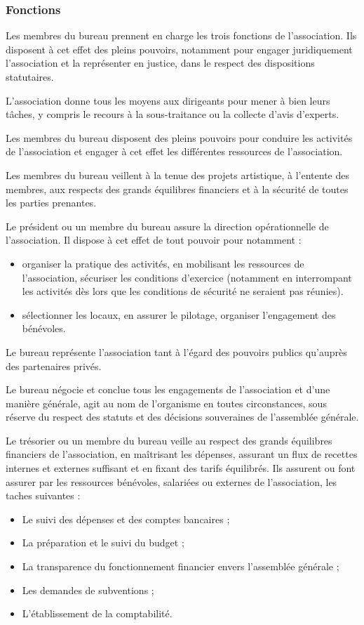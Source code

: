 \documentclass[a4paper,french,10pt]{article}
\begin{document}
\subsubsection{Fonctions}
\label{sec:fonctions}

Les membres du bureau prennent en charge les trois fonctions de
l’association.  Ils disposent à cet effet des pleins pouvoirs,
notamment pour engager juridiquement l’association et la représenter
en justice, dans le respect des dispositions statutaires.

L’association donne tous les moyens aux dirigeants pour mener à bien
leurs tâches, y compris le recours à la sous-traitance ou la collecte
d’avis d’experts.

Les membres du bureau disposent des pleins pouvoirs pour conduire les
activités de l’association et engager à cet effet les différentes
ressources de l’association.

Les membres du bureau veillent à la tenue des projets artistique, à
l'entente des membres, aux respects des grands équilibres financiers
et à la sécurité de toutes les parties prenantes.  


Le président ou un membre du bureau assure la direction opérationnelle de
l’association. Il dispose à cet effet de tout pouvoir pour notamment :
\begin{itemize}
\item organiser la pratique des activités, en mobilisant les
  ressources de l’association, sécuriser les conditions d’exercice
  (notamment en interrompant les activités dès lors que les conditions
  de sécurité ne seraient pas réunies).
\item sélectionner les locaux, en assurer le pilotage, organiser
  l’engagement des bénévoles.
\end{itemize}

Le bureau représente l’association tant à l’égard des pouvoirs
publics qu’auprès des partenaires privés.

Le bureau négocie et conclue tous les engagements de l’association et
d’une manière générale, agit au nom de l’organisme en toutes
circonstances, sous réserve du respect des statuts et des décisions
souveraines de l’assemblée générale.




Le trésorier ou un membre du bureau veille au respect des grands équilibres financiers de
l’association, en maîtrisant les dépenses, assurant un flux de
recettes internes et externes suffisant et en fixant des tarifs
équilibrés. Ils assurent ou font assurer par les ressources bénévoles,
salariées ou externes de l’association, les taches suivantes :
\begin{itemize}
\item Le suivi des dépenses et des comptes bancaires ;
\item La préparation et le suivi du budget ;
\item La transparence du fonctionnement financier envers l’assemblée générale ;
\item Les demandes de subventions ;
\item L’établissement de la comptabilité.
\end{itemize}
\end{document}
